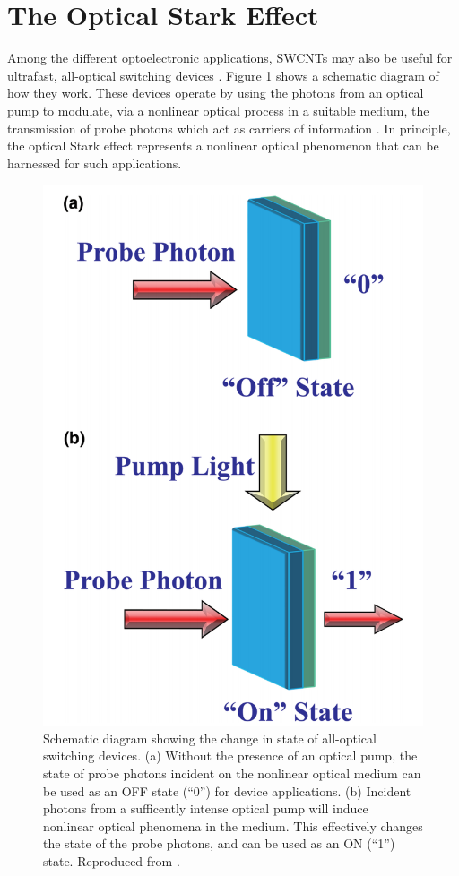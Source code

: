 \section{The Optical Stark Effect}
Among the different optoelectronic applications, SWCNTs may also be useful for ultrafast, all-optical switching devices \cite{chai2017ultrafast}. Figure \ref{fig:optical_switch_chai_2017} shows a schematic diagram of how they work. These devices operate by using the photons from an optical pump to modulate, via a nonlinear optical process in a suitable medium, the transmission of probe photons which act as carriers of information \cite{chai2017ultrafast}. In principle, the optical Stark effect represents a nonlinear optical phenomenon that can be harnessed for such applications.

\begin{figure}[ht]
	\centering
	\includegraphics[scale=0.2]{images/chapter_prior_works/optical_switching_chai_2017}
	\caption{Schematic diagram showing the change in state of all-optical switching devices. (a) Without the presence of an optical pump, the state of probe photons incident on the nonlinear optical medium can be used as an OFF state (``0'') for device applications. (b) Incident photons from a sufficently intense optical pump will induce nonlinear optical phenomena in the medium. This effectively changes the state of the probe photons, and can be used as an ON (``1'') state. Reproduced from \cite{chai2017ultrafast}.}
	\label{fig:optical_switch_chai_2017}
\end{figure}

